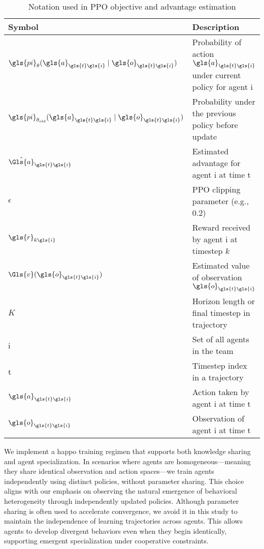 \documentclass{article}
\begin{document}
\begin{table}[ht]
    \centering
    \caption{Notation used in PPO objective and advantage estimation}
    \begin{tabular}{ll}
    \toprule
    \textbf{Symbol} & \textbf{Description} \\
    \midrule
    \(\gls{pi}_\theta(\gls{a}_{\gls{t}\gls{i}} \mid \gls{o}_{\gls{t}\gls{i}})\) & 
        Probability of action \(\gls{a}_{\gls{t}\gls{i}}\) under current policy 
        for agent \gls{i} \\
    \(\gls{pi}_{\theta_{\text{old}}}(\gls{a}_{\gls{t}\gls{i}} \mid \gls{o}_{\gls{t}\gls{i}})\) & 
        Probability under the previous policy before update \\
    \(\hat{\Gls{a}}_{\gls{t}\gls{i}}\) & Estimated advantage for agent \gls{i} at time \gls{t} \\
    \(\epsilon\) & PPO clipping parameter (e.g., 0.2) \\
    \(\gls{r}_{k\gls{i}}\) & Reward received by agent \gls{i} at timestep \(k\) \\
    \(\Gls{v}(\gls{o}_{\gls{t}\gls{i}})\) & Estimated value of observation \(\gls{o}_{\gls{t}\gls{i}}\) \\
    \(K\) & Horizon length or final timestep in trajectory \\
    \Gls{i} & Set of all agents in the team \\
    \gls{t} & Timestep index in a trajectory \\
    \(\gls{a}_{\gls{t}\gls{i}}\) & Action taken by agent \gls{i} at time \gls{t} \\
    \(\gls{o}_{\gls{t}\gls{i}}\) & Observation of agent \gls{i} at time \gls{t} \\
    \bottomrule
    \end{tabular}
\end{table}

We implement a \gls{happo} training regimen that supports both 
knowledge sharing and agent specialization. In scenarios where agents are 
homogeneous—meaning they share identical observation and action spaces—we train agents 
independently using distinct policies, without parameter sharing. 
This choice aligns with our emphasis on observing the natural emergence of 
behavioral heterogeneity through independently updated policies. 
Although parameter sharing is often used to accelerate convergence, 
we avoid it in this study to maintain the independence of learning trajectories across agents. 
This allows agents to develop divergent behaviors even when they begin identically, 
supporting emergent specialization under cooperative constraints.
\end{document}
